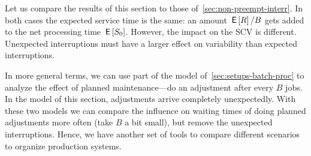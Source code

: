 \begin{remark}
  Let us compare the results of this section to those of~\cref{sec:non-preempt-interr}.
  In both cases the expected service time is the same: an amount $\,\mathsf{E}\left[R\right]/ B$ gets added to the net processing time $\,\mathsf{E}\left[S_0\right]$.
  However, the impact on the SCV is different.
  Unexpected interruptions must have a larger effect on variability than expected interruptions.

  In more general terms, we can use part of the model of~\cref{sec:setups-batch-proc} to analyze the effect of planned maintenance---do an adjustment after every $B$ jobs.
  In the model of this section, adjustments arrive completely unexpectedly.
  With these two models we can compare the influence on waiting times of doing planned adjustments more often (take $B$ a bit small), but remove the unexpected interruptions.
  Hence, we have another set of tools to compare different scenarios to organize production systems.
\end{remark}



